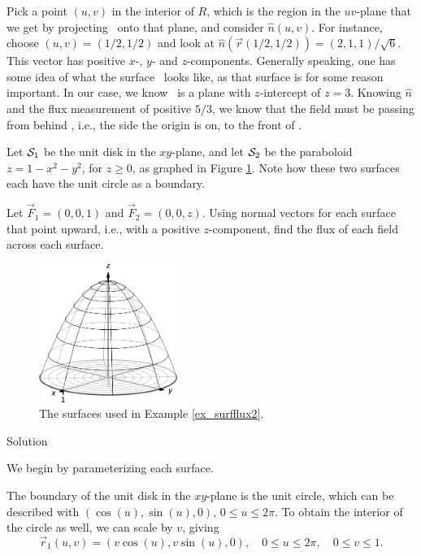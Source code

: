 \begin{example}
Pick a point $(u,v)$ in the interior of $R$, which is the region in the $uv$-plane that we get by projecting \surfaceS\ onto that plane, and consider $\hat n(u,v)$. For instance, choose $(u,v)=(1/2,1/2)$ and look at $\hat n\left(\vec r(1/2,1/2)\right) = \left( 2,1,1\right)/\sqrt{6}$. This vector has positive $x$-, $y$- and $z$-components. Generally speaking, one has some idea of what the surface \surfaceS\ looks like, as that surface is for some reason important. In our case, we know \surfaceS\ is a plane with $z$-intercept of $z=3$. Knowing $\hat n$ and the flux measurement of positive $5/3$, we know that the field must be passing from behind \surfaceS, i.e., the side the origin is on, to the front of \surfaceS.
\end{example}

\begin{example}
\label{ex_surfflux2}
Let $\mathcal{S}_1$ be the unit disk in the $xy$-plane, and let $\mathcal{S}_2$ be the paraboloid $z=1-x^2-y^2$, for $z\geq 0$, as graphed in Figure \ref{fig_Vector_Calc_28}. Note how these two surfaces each have the unit circle as a boundary.
 

Let $\vec F_1 = \left( 0,0,1\right)$ and $\vec F_2 = \left( 0,0,z\right)$. Using normal vectors for each surface that point upward, i.e., with a positive $z$-component, find the flux of each field across each surface. 

\begin{figure}[H]
	\begin{center}
			\includegraphics[width=0.4\textwidth]{fig_Vector_Calc_28}
	\caption{The surfaces used in  Example \ref{ex_surfflux2}.}
	\label{fig_Vector_Calc_28}
	\end{center}
\end{figure}


Solution 

We begin by parameterizing each surface.

The boundary of the unit disk in the $xy$-plane is the unit circle, which can be described with $\left( \cos (u),\sin (u),0\right)$, $0\leq u\leq 2\pi$. To obtain the interior of the circle as well, we can scale by $v$, giving
$$\vec r_1(u,v) = \left( v\cos (u),v\sin (u), 0\right), \quad 0\leq u\leq 2\pi, \quad 0\leq v\leq 1.$$


\end{example}
